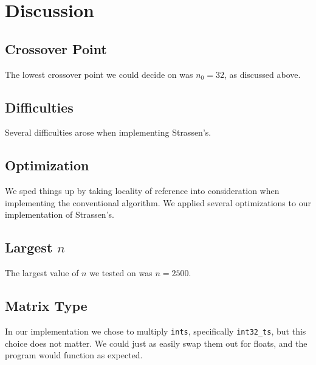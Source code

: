 \documentclass[solution, letterpaper]{cs121}
\begin{document}
\section*{Discussion}

\subsection*{Crossover Point}
The lowest crossover point we could decide on was $n_0 = 32$, as discussed above.

\subsection*{Difficulties}
Several difficulties arose when implementing Strassen's.

\subsection*{Optimization}
We sped things up by taking locality of reference into consideration when implementing the conventional algorithm. We applied several optimizations to our implementation of Strassen's.

\subsection*{Largest $n$}
The largest value of $n$ we tested on was $n = 2500$. 

\subsection*{Matrix Type}
In our implementation we chose to multiply {\tt ints}, specifically {\tt int32\_ts}, but this choice does not matter. We could just as easily swap them out for floats, and the program would function as expected.
\end{document}
